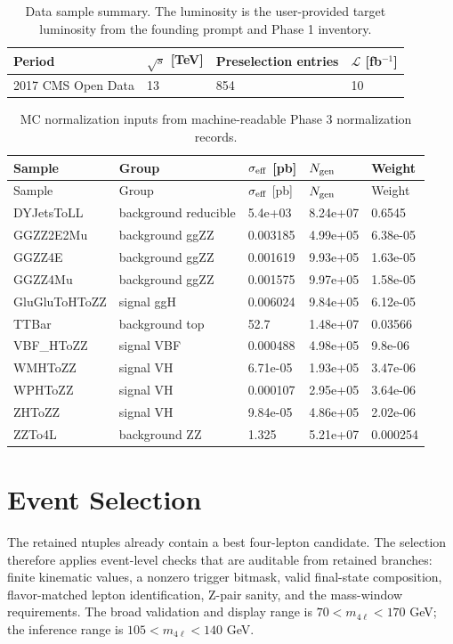 \documentclass[11pt]{article}
\begin{document}
\begin{table}[htbp]
\centering
\caption{Data sample summary. The luminosity is the user-provided target luminosity from the founding prompt and Phase 1 inventory.}
\begin{tabular}{llll}
\toprule
Period & $\sqrt{s}$ [TeV] & Preselection entries & $\mathcal{L}$ [fb$^{-1}$] \\ 
\midrule
2017 CMS Open Data & 13 & 854 & 10 \\ 
\bottomrule
\end{tabular}
\label{tab:data-summary}
\end{table}

\begin{longtable}{lllll}
\caption{MC normalization inputs from machine-readable Phase 3 normalization records.}\label{tab:mc-samples}\\
\toprule
Sample & Group & $\sigma_{\rm eff}$ [pb] & $N_{\rm gen}$ & Weight \\ 
\midrule
\endfirsthead
\toprule
Sample & Group & $\sigma_{\rm eff}$ [pb] & $N_{\rm gen}$ & Weight \\ 
\midrule
\endhead
DYJetsToLL & background reducible & 5.4e+03 & 8.24e+07 & 0.6545 \\
GGZZ2E2Mu & background ggZZ & 0.003185 & 4.99e+05 & 6.38e-05 \\
GGZZ4E & background ggZZ & 0.001619 & 9.93e+05 & 1.63e-05 \\
GGZZ4Mu & background ggZZ & 0.001575 & 9.97e+05 & 1.58e-05 \\
GluGluToHToZZ & signal ggH & 0.006024 & 9.84e+05 & 6.12e-05 \\
TTBar & background top & 52.7 & 1.48e+07 & 0.03566 \\
VBF\_HToZZ & signal VBF & 0.000488 & 4.98e+05 & 9.8e-06 \\
WMHToZZ & signal VH & 6.71e-05 & 1.93e+05 & 3.47e-06 \\
WPHToZZ & signal VH & 0.000107 & 2.95e+05 & 3.64e-06 \\
ZHToZZ & signal VH & 9.84e-05 & 4.86e+05 & 2.02e-06 \\
ZZTo4L & background ZZ & 1.325 & 5.21e+07 & 0.000254 \\
\bottomrule
\end{longtable}


\section{Event Selection}
The retained ntuples already contain a best four-lepton candidate. The selection therefore applies event-level checks that are auditable from retained branches: finite kinematic values, a nonzero trigger bitmask, valid final-state composition, flavor-matched lepton identification, Z-pair sanity, and the mass-window requirements. The broad validation and display range is $70<m_{4\ell}<170$ GeV; the inference range is $105<m_{4\ell}<140$ GeV.
\end{document}

